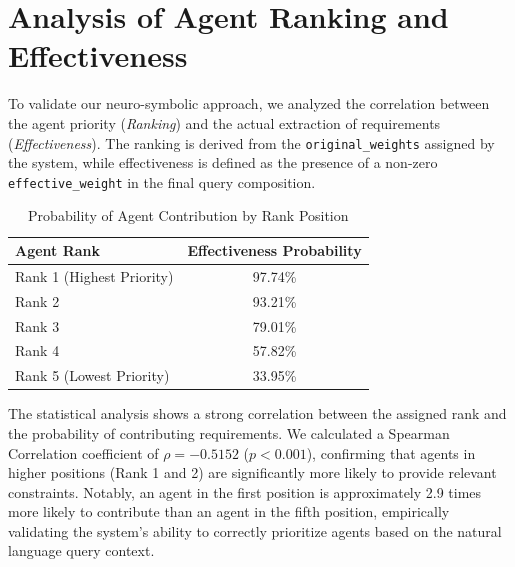 \section{Analysis of Agent Ranking and Effectiveness}
\label{sec:rank_analysis}

To validate our neuro-symbolic approach, we analyzed the correlation between the agent priority (\textit{Ranking}) and the actual extraction of requirements (\textit{Effectiveness}). The ranking is derived from the \texttt{original\_weights} assigned by the system, while effectiveness is defined as the presence of a non-zero \texttt{effective\_weight} in the final query composition.

\begin{table}[h]
\centering
\caption{Probability of Agent Contribution by Rank Position}
\label{tab:rank_effectiveness}
\begin{tabular}{lc}
\hline
\textbf{Agent Rank} & \textbf{Effectiveness Probability} \\
\hline
Rank 1 (Highest Priority) & 97.74\% \\
Rank 2 & 93.21\% \\
Rank 3 & 79.01\% \\
Rank 4 & 57.82\% \\
Rank 5 (Lowest Priority) & 33.95\% \\
\hline
\end{tabular}
\end{table}

The statistical analysis shows a strong correlation between the assigned rank and the probability of contributing requirements. We calculated a Spearman Correlation coefficient of $\rho = -0.5152$ ($p < 0.001$), confirming that agents in higher positions (Rank 1 and 2) are significantly more likely to provide relevant constraints. Notably, an agent in the first position is approximately 2.9 times more likely to contribute than an agent in the fifth position, empirically validating the system's ability to correctly prioritize agents based on the natural language query context.
